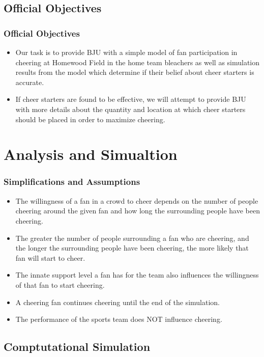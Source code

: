 \documentclass[compress,handout,10pt]{beamer}
\let\olditem\item
\renewcommand{\item}{\setlength{\itemsep}{0.5\baselineskip}\olditem}
\begin{document}
\subsection{Official Objectives}

\begin{frame}
	\frametitle {Official Objectives}
	\begin {itemize}
		\item Our task is to provide BJU with a simple model of fan participation in cheering at Homewood Field in the home team bleachers as well as simulation results from the model which determine if their belief about cheer starters is accurate.
		\item If cheer starters are found to be effective, we will attempt to provide BJU with more details about the quantity and location at which cheer starters should be placed in order to maximize cheering.
		\end {itemize}
\end{frame}

\section{Analysis and Simualtion}
\begin{frame}
\frametitle{Simplifications and Assumptions}
\begin{itemize}
	\item The willingness of a fan in a crowd to cheer depends on the number of people cheering around the given fan and how long the surrounding people have been cheering. 
	\item The greater the number of people surrounding a fan who are cheering, and the longer the surrounding people have been cheering, the more likely that fan will start to cheer.
	\item The innate support level a fan has for the team also influences the willingness of that fan to start cheering.
	\item A cheering fan continues cheering until the end of the simulation.
	\item The performance of the sports team does NOT influence cheering.
	\end{itemize}
\end{frame}

\subsection{Comptutational Simulation}
\end{document}
